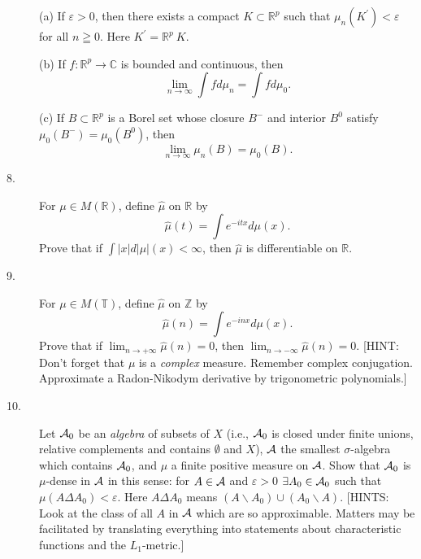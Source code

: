 \documentclass{article}
\def\R{\mathbb R}
\def\C{\mathbb C}
\def\Z{\mathbb Z}
\def\T{\mathbb T}
\def\Z{\mathbb Z}
\begin{document}
\begin{description}
\item[\quad] (a)
If $\varepsilon > 0$, then there exists a compact $K \subset \R^p$ such that
$\mu_n(K^\prime) < \varepsilon$ for all $n \geqq 0$. Here
$K^\prime = \R^p \ K$.

\item[\quad] (b)
If $f: \R^p \to \C$ is bounded and continuous, then
$$\lim_{n \to \infty} \int fd\mu_n = \int f d\mu_0.$$

\item[\quad] (c)
If $B \subset \R^p$ is a Borel set whose closure $B^-$ and interior $B^0$
satisfy $\mu_0(B^-)=\mu_0 (B^0)$, then
$$\lim_{n\to \infty} \mu_n (B) = \mu_0 (B).$$

\item[8.]
For $\mu \in M(\R)$, define $\widehat \mu$ on $\R$ by
$$\widehat \mu (t) = \int e^{-itx} d\mu (x).$$
Prove that if $\int |x| d |\mu| (x) < \infty$, then $\widehat \mu$ is
differentiable on $\R$.

\item[9.]
For $\mu \in M(\T)$, define $\widehat \mu$ on $\Z$ by
$$\widehat \mu (n) = \int e^{-inx} d\mu (x).$$
Prove that if $\lim_{n \to +\infty} \widehat \mu (n) = 0$, then
$\lim_{n \to -\infty} \widehat \mu (n) = 0$. [HINT: Don't forget
that $\mu$ is a {\it complex} measure. Remember complex conjugation.
Approximate a Radon-Nikodym derivative by trigonometric polynomials.]

\item[10.]
Let ${\cal A}_0$ be an {\it algebra} of subsets of $X$ (i.e.,
${\cal A}_0$ is closed under finite unions, relative complements and contains
$\emptyset$ and $X$), ${\cal A}$ the smallest $\sigma$-algebra which contains
${\cal A}_0$, and $\mu$ a finite positive measure on ${\cal A}$. Show that
${\cal A}_0$ is $\mu$-dense in ${\cal A}$ in this sense: for $A \in {\cal A}$
and $\varepsilon > 0$ $\exists A_0 \in {\cal A}_0$ such that
$\mu(A \Delta A_0) < \varepsilon$. Here $A \Delta A_0$ means
$(A \backslash A_0) \cup (A_0 \backslash A)$. [HINTS: Look at the class of
all $A$ in ${\cal A}$ which are so approximable. Matters may be facilitated
by translating everything into statements about characteristic functions and
the $L_1$-metric.]







\end{description}    
\end{document}
